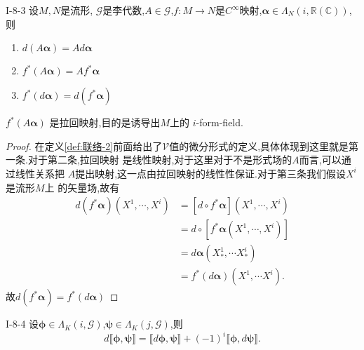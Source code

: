 \documentclass[../main.tex]{subfiles}
\begin{document}
\begin{theorem}
  {}{I-8-3}
  设$M,N$是流形, $\mathscr{G}$是李代数,$A \in \mathscr{G}$,$f:M \to N$是$C^\infty$映射,$\bm{\alpha} \in \Lambda_N(i,\mathbb{R}(\mathbb{C}))$,则
  \begin{enumerate}
    \item $d(A\bm{\alpha}) = A d\bm{\alpha}  $
    \item $f^*(A \bm{\alpha} ) = A f^* \bm{\alpha} $
    \item $f^*(d\bm{\alpha}) = d(f^* \bm{\alpha} ) $
  \end{enumerate}
  $f^*(A\bm{\alpha}) $ 是拉回映射,目的是诱导出$M$上的 $i$-form-field.
\end{theorem}
\begin{proof}
  在定义\ref{def:联络-2}前面给出了$\mathscr{V}$值的微分形式的定义,具体体现到这里就是第一条.对于第二条,拉回映射
  是线性映射,对于这里对于不是形式场的$A$而言,可以通过线性关系把 $A$提出映射,这一点由拉回映射的线性性保证.对于第三条我们假设$X^i$是流形$M$上
  的矢量场,故有
   \begin{align*}
     d(f^*\bm{\alpha})(X^1,\cdots,X^i)& = [d\circ f^*\bm{\alpha}]  (X^1,\cdots,X^i)\\
                                      & = d\circ [f^*\bm{\alpha}(X^1,\cdots,X^i) ]\\
                                      & = d\bm{\alpha}(X^1_*,\cdots X^i_*) \\
                                      & = f^*(d\bm{\alpha})(X^1,\cdots X^i)
  .\end{align*}
  故$d(f^* \bm{\alpha}) = f^*(d \bm{\alpha})$
\end{proof}
\begin{theorem}
  {}{I-8-4}
  设$\bm{\phi}\in \Lambda_K(i,\mathscr{G})$,$\bm{\psi} \in \Lambda_K(j,\mathscr{G})$,则\[
    d\llbracket \bm{\phi} ,\bm{\psi}  \rrbracket = \llbracket d\bm{\phi} ,\bm{\psi}  \rrbracket + (-1)^i \llbracket \bm{\phi} ,d \bm{\psi} \rrbracket 
  .\] 
\end{theorem}
\end{document}
